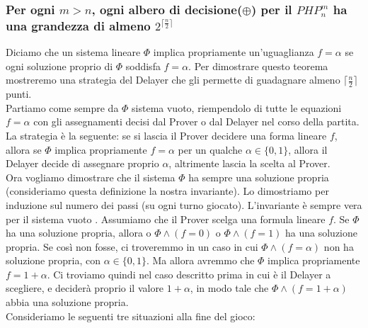 \documentclass[it]{article}
\begin{document}
    \subsubsection{Per ogni $m>n$, ogni albero di decisione($\oplus$) per il $PHP_{n}^{m}$ ha una grandezza di almeno $2^{\lceil \frac{n}{2} \rceil}$}
    Diciamo che un sistema lineare $\Phi$ implica propriamente un'uguaglianza $f=\alpha$ se ogni soluzione proprio di $\Phi$ soddisfa $f=\alpha$.
    Per dimostrare questo teorema mostreremo una strategia del Delayer che gli permette di guadagnare almeno $\lceil \frac{n}{2} \rceil$ punti. \\
    Partiamo come sempre da $\Phi$ sistema vuoto, riempendolo di tutte le equazioni $f=\alpha$ con gli assegnamenti decisi dal Prover o dal Delayer nel corso della partita. La strategia è la seguente: se si lascia il Prover decidere una forma lineare $\displaystyle f$, allora se $\Phi$ implica propriamente $f=\alpha$ per un qualche $\alpha \in \{0,1\}$, allora il Delayer decide di assegnare proprio $\alpha$, altrimente lascia la scelta al Prover.\\
    Ora vogliamo dimostrare che il sistema $\Phi$ ha sempre una soluzione propria (consideriamo questa definizione la nostra invariante). Lo dimostriamo per induzione sul numero dei passi (su ogni turno giocato). L'invariante è sempre vera per il sistema vuoto . Assumiamo che il Prover scelga una formula lineare $\displaystyle f$. Se $\Phi$ ha una soluzione propria, allora o $\Phi \land (f=0)$ o $\Phi \land (f=1)$ ha una soluzione propria. Se così non fosse, ci troveremmo in un caso in cui $\Phi \land (f=\alpha)$ non ha soluzione propria, con $\alpha \in \{0,1\}$. Ma allora avremmo che $\Phi$ implica propriamente $f=1+\alpha$. Ci troviamo quindi nel caso descritto prima in cui è il Delayer a scegliere, e deciderà proprio il valore $1+\alpha$, in modo tale che $\Phi \land (f=1+\alpha)$ abbia una soluzione propria.\\
    Consideriamo le seguenti tre situazioni alla fine del gioco:
\end{document}
